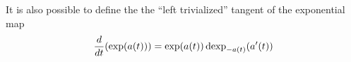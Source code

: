 It is also possible to define the  the ``left trivialized'' tangent of the exponential map
\begin{equation}
  \label{eq:46}
   \frac{d}{dt} (\exp(a(t))) =  \exp(a(t)) \operatorname{dexp}_{-a(t)}(a'(t))
\end{equation}



